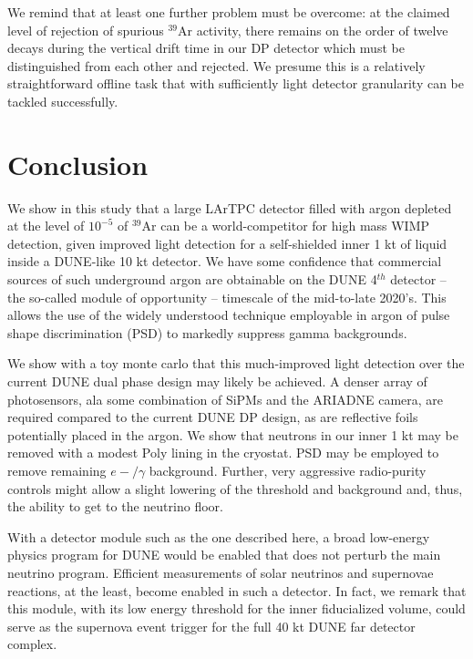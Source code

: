 \documentclass[a4paper,11pt]{article}
\begin{document}
We remind that at least one further problem must be overcome: at the claimed level of rejection of spurious $^{39}$Ar activity, there remains on the order of twelve decays during the vertical drift time in our DP detector which must be distinguished from each other and rejected. We presume this is a relatively straightforward offline task that with sufficiently light detector granularity can be tackled successfully.

\section{Conclusion}
We show in this study that a large LArTPC detector filled with argon depleted at the level of $10^{-5}$ of $^{39}$Ar can be a world-competitor for high mass WIMP detection, given improved light detection for a self-shielded inner 1 kt of liquid  inside a DUNE-like 10 kt detector. We have some  confidence that commercial sources of such underground argon are obtainable on the DUNE 4$^{th}$ detector -- the so-called module of opportunity -- timescale of the mid-to-late 2020's. This allows the use of the widely understood technique employable in argon of pulse shape discrimination (PSD) to markedly suppress gamma backgrounds. 

We show with a toy monte carlo that this much-improved light detection over the current DUNE dual phase design may likely be achieved. A denser array of photosensors, ala some combination of SiPMs and the ARIADNE camera, are required compared to the current DUNE DP design, as are reflective foils potentially placed in the argon. We show that neutrons in our inner 1 kt may be removed with a modest Poly lining in the cryostat. PSD may be employed to remove remaining $e-/\gamma$ background. Further, very aggressive radio-purity controls might allow a slight lowering of the threshold and background and, thus, the ability to get to the neutrino floor.

With a detector module such as the one described here, a broad low-energy physics program for DUNE would be enabled that does not perturb the main neutrino program. Efficient measurements of solar neutrinos and supernovae reactions, at the least, become enabled in such a detector. In fact, we remark that this module, with its low energy threshold for the inner fiducialized volume, could serve as the supernova event trigger for the full 40 kt DUNE far detector complex.


\end{document}
